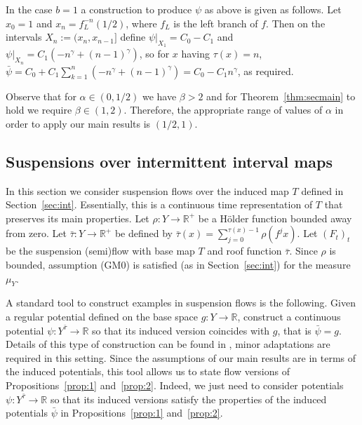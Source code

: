 \documentclass[12pt]{article}
\numberwithin{equation}{section}
\newcommand{\R}{\mathbb{R}}
\newcommand{\F}{F}
\begin{document}
In the case $b=1$ a construction to produce $\psi$ as above is given as follows.  Let $x_0=1$ and $x_n=f_L^{-n}(1/2)$, where $f_L$ is the left branch of $f$.  Then on the intervals $X_n:= (x_n, x_{n-1}]$ define $\psi|_{X_1} = C_0-C_1$ and $\psi|_{X_n} =C_1(-n^\gamma+(n-1)^\gamma)$, so for $x$ having $\tau(x) = n$, $\bar\psi = C_0+C_1\sum_{k=1}^n(-n^\gamma+(n-1)^\gamma) = C_0 - C_1n^\gamma$, as required.

Observe that for $\alpha \in (0, 1/2)$ we have $\beta >2$ and for Theorem~\ref{thm:secmain} to hold we require 
$\beta \in (1,2)$. Therefore, the appropriate range of values of $\alpha$ in order to apply our main results is $(1/2, 1)$.
 




\subsection{Suspensions over intermittent interval maps}

In this section we consider suspension flows over the induced map $T$ defined in Section~\ref{sec:int}. 
Essentially, this is a continuous time representation of $T$ that preserves its main properties. 
Let $\rho: Y \to \R^+$ be a H\"older function bounded away from zero. Let $\bar \tau: Y \to \R^+$ 
be defined by $\bar \tau (x)= \sum_{j=0}^{\tau(x)-1}
\rho(f^j x)$. Let $(\F_t)_t$ be the suspension (semi)flow with base map $T$ and roof function $\bar \tau$. 
Since $\rho$ is bounded, assumption (GM0) is satisfied (as in Section~\ref{sec:int}) for the measure $\mu_Y$. 

A standard tool to construct examples in suspension flows is the following. Given a regular potential defined 
on the base space $g: Y \to \R$, construct a  continuous potential $\psi: Y^{\bar \tau} \to \R$ so that its 
induced version coincides with $g$, that is $\bar \psi = g$. Details of this type of construction can be found 
in \cite{brw}, minor adaptations are required in this setting. Since the assumptions of our main results are 
in terms of the induced potentials, this tool allows us to state flow versions of Propositions~\ref{prop:1} and~\ref{prop:2}. 
Indeed, we just need to consider potentials $\psi: Y^{\bar \tau} \to \R$ so that its induced versions satisfy 
the properties of the induced potentials $\bar \psi$ in Propositions~\ref{prop:1} and~\ref{prop:2}.
\end{document}
